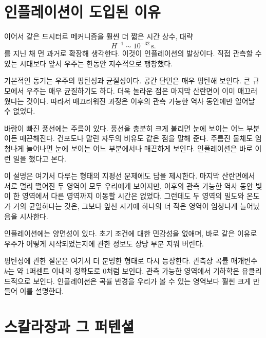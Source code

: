 \section{인플레이션이 도입된 이유}

이어서 같은 드시터르 메커니즘을 훨씬 더 짧은 시간 상수, 대략
\begin{equation}
H^{-1}\sim 10^{-32}\,\mathrm{s}.
\end{equation}
를 지닌 채 먼 과거로 확장해 생각한다. 이것이 인플레이션의 발상이다. 직접 관측할 수 있는 시대보다 앞서 우주는 한동안 지수적으로 팽창했다.

기본적인 동기는 우주의 평탄성과 균질성이다. 공간 단면은 매우 평탄해 보인다. 큰 규모에서 우주는 매우 균질하기도 하다. 더욱 놀라운 점은 마지막 산란면이 이미 매끄러웠다는 것이다. 따라서 매끄러워진 과정은 이후의 관측 가능한 역사 동안에만 일어날 수 없었다.

바람이 빠진 풍선에는 주름이 있다. 풍선을 충분히 크게 불리면 눈에 보이는 어느 부분이든 매끈해진다. 건포도나 말린 자두의 비유도 같은 점을 말해 준다. 주름진 물체도 엄청나게 늘어나면 눈에 보이는 어느 부분에서나 매끈하게 보인다. 인플레이션은 바로 이런 일을 했다고 본다.

이 설명은 여기서 다루는 형태의 지평선 문제에도 답을 제시한다. 마지막 산란면에서 서로 멀리 떨어진 두 영역이 모두 우리에게 보이지만, 이후의 관측 가능한 역사 동안 빛이 한 영역에서 다른 영역까지 이동할 시간은 없었다. 그런데도 두 영역의 밀도와 온도가 거의 균일하다는 것은, 그보다 앞선 시기에 하나의 더 작은 영역이 엄청나게 늘어났음을 시사한다.

인플레이션에는 양면성이 있다. 초기 조건에 대한 민감성을 없애며, 바로 같은 이유로 우주가 어떻게 시작되었는지에 관한 정보도 상당 부분 지워 버린다.

평탄성에 관한 질문은 여기서 더 분명한 형태로 다시 등장한다. 관측상 곡률 매개변수 \(k\)는 약 1퍼센트 이내의 정확도로 0처럼 보인다. 관측 가능한 영역에서 기하학은 유클리드적으로 보인다. 인플레이션은 곡률 반경을 우리가 볼 수 있는 영역보다 훨씬 크게 만들어 이를 설명한다.

\begin{classroomqa}
\end{classroomqa}

\section{스칼라장과 그 퍼텐셜}

